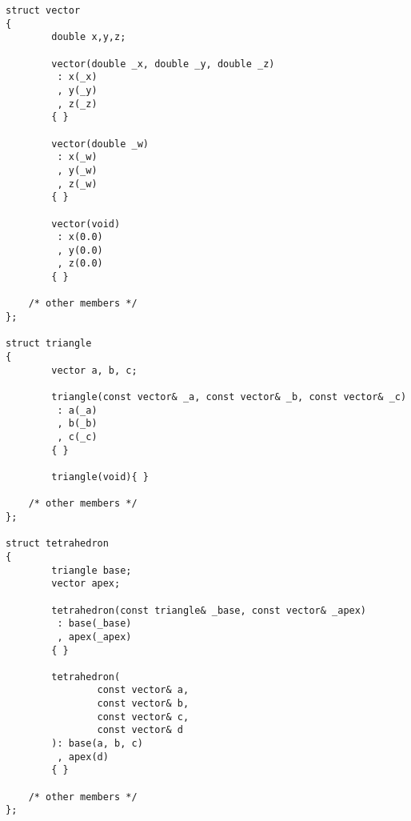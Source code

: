 \begin{lstlisting}
struct vector
{
        double x,y,z;

        vector(double _x, double _y, double _z)
         : x(_x)
         , y(_y)
         , z(_z)
        { }

        vector(double _w)
         : x(_w)
         , y(_w)
         , z(_w)
        { }

        vector(void)
         : x(0.0)
         , y(0.0)
         , z(0.0)
        { }

	/* other members */
};

struct triangle
{
        vector a, b, c;

        triangle(const vector& _a, const vector& _b, const vector& _c)
         : a(_a)
         , b(_b)
         , c(_c)
        { }

        triangle(void){ }

	/* other members */
};

struct tetrahedron
{
        triangle base;
        vector apex;

        tetrahedron(const triangle& _base, const vector& _apex)
         : base(_base)
         , apex(_apex)
        { }

        tetrahedron(
                const vector& a,
                const vector& b,
                const vector& c,
                const vector& d
        ): base(a, b, c)
         , apex(d)
        { }

	/* other members */
};

\end{lstlisting}

